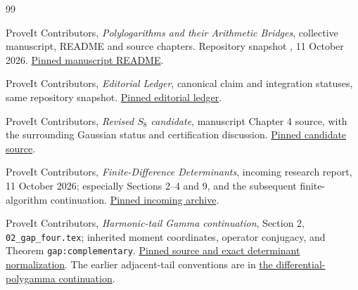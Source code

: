 \clearpage
\begin{thebibliography}{99}
\raggedright

ProveIt Contributors,
\emph{Polylogarithms and their Arithmetic Bridges}, collective
manuscript, README and source chapters.
Repository snapshot \repo, 11 October 2026.
\href{https://github.com/VladimirReshetnikov/ProveIt/blob/e3d7ec5d3f9be259c1f91edaea4389f4e79b5b03/Analysis/Polylogarithms/docs/manuscript/README.md}{Pinned manuscript README}.

ProveIt Contributors,
\emph{Editorial Ledger}, canonical claim and integration statuses,
same repository snapshot.
\href{https://github.com/VladimirReshetnikov/ProveIt/blob/e3d7ec5d3f9be259c1f91edaea4389f4e79b5b03/Analysis/Polylogarithms/docs/manuscript/EDITORIAL-LEDGER.md}{Pinned editorial ledger}.

ProveIt Contributors,
\emph{Revised \(S_8\) candidate}, manuscript Chapter 4 source,
with the surrounding Gaussian status and certification discussion.
\href{https://github.com/VladimirReshetnikov/ProveIt/blob/e3d7ec5d3f9be259c1f91edaea4389f4e79b5b03/Analysis/Polylogarithms/docs/manuscript/chapters/04-S8-candidate.tex}{Pinned candidate source}.

ProveIt Contributors,
\emph{Finite-Difference Determinants}, incoming research report,
11 October 2026; especially Sections 2--4 and 9, and the subsequent
finite-algorithm continuation.
\href{https://github.com/VladimirReshetnikov/ProveIt/blob/e3d7ec5d3f9be259c1f91edaea4389f4e79b5b03/docs/incoming/ProveIt_Finite_Difference_Determinants_2026-10-11.zip}{Pinned incoming archive}.

ProveIt Contributors,
\emph{Harmonic-tail Gamma continuation}, Section 2,
\texttt{02\_gap\_four.tex}; inherited moment coordinates,
operator conjugacy, and Theorem \texttt{gap:complementary}.
\href{https://github.com/VladimirReshetnikov/ProveIt/blob/e3d7ec5d3f9be259c1f91edaea4389f4e79b5b03/Analysis/Polylogarithms/docs/reports/stieltjes-harmonic-resonance/continuations/harmonic-tail-gamma/sections/02_gap_four.tex}{Pinned source and exact determinant normalization}.
The earlier adjacent-tail conventions are in
\href{https://github.com/VladimirReshetnikov/ProveIt/blob/e3d7ec5d3f9be259c1f91edaea4389f4e79b5b03/Analysis/Polylogarithms/docs/reports/stieltjes-harmonic-resonance/continuations/differential-polygamma-lerch-jets/sections/08_adjacent_tails.tex}{the differential-polygamma continuation}.


\end{thebibliography}
